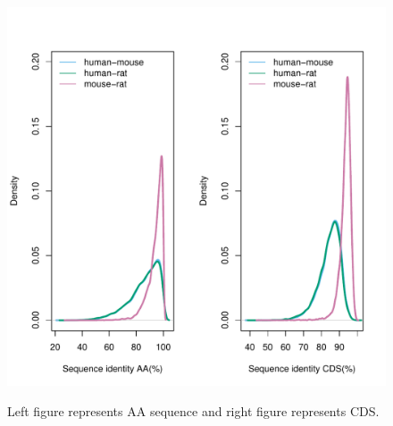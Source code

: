 \begin{figure}[H]
     \centering
     \begin{minipage}[t]{1\textwidth }
     \includegraphics[width=\linewidth]{Fig2.pdf}
     {{Left figure represents AA sequence and right figure represents CDS.}
     \par}
     \end{minipage}
\end{figure}

